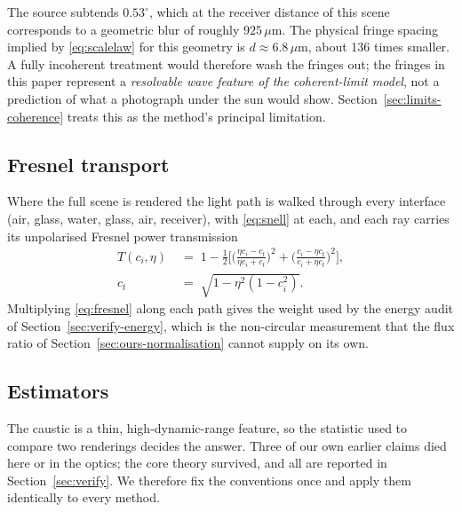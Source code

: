 The source subtends $0.53^\circ$, which at the receiver distance of this
scene corresponds to a geometric blur of roughly $925\,\mu\text{m}$. The
physical fringe spacing implied by \eqref{eq:scalelaw} for this geometry is
$d \approx 6.8\,\mu\text{m}$, about \num{136} times smaller. A fully incoherent
treatment would therefore wash the fringes out; the fringes in this paper
represent a \emph{resolvable wave feature of the coherent-limit model},
not a prediction of what a photograph under the sun would show.
Section~\ref{sec:limits-coherence} treats this as the method's principal limitation.

\subsection{Fresnel transport}
\label{sec:fresnel}

Where the full scene is rendered the light path is walked through every
interface (air, glass, water, glass, air, receiver), with \eqref{eq:snell} at each, and each ray carries its unpolarised Fresnel power transmission
\begin{equation}
\begin{aligned}
T(c_i,\eta) \;&=\; 1 - \frac12\Bigg[
\Big(\frac{\eta c_i - c_t}{\eta c_i + c_t}\Big)^{2}
+ \Big(\frac{c_i - \eta c_t}{c_i + \eta c_t}\Big)^{2} \Bigg], \\[2pt]
c_t \;&=\; \sqrt{1 - \eta^2(1-c_i^2)} .
\end{aligned}
\label{eq:fresnel}
\end{equation}
Multiplying \eqref{eq:fresnel} along each path gives the weight used by the
energy audit of Section~\ref{sec:verify-energy}, which is the non-circular
measurement that the flux ratio of Section~\ref{sec:ours-normalisation} cannot
supply on its own.

\subsection{Estimators}
\label{sec:estimators}

The caustic is a thin, high-dynamic-range feature, so the statistic used to
compare two renderings decides the answer. Three of our own earlier claims died here or in the optics; the core theory survived, and all are reported in
Section~\ref{sec:verify}. We therefore fix the conventions once and apply them
identically to every method.

